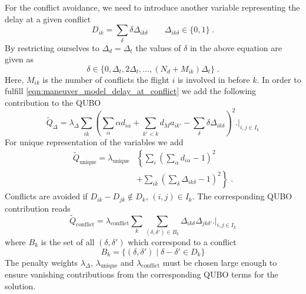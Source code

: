 \documentclass[aps,pra,twocolumn,10pt]{revtex4-1}
\begin{document}
For the conflict avoidance, we need to introduce another variable representing the delay at a given conflict
\begin{equation*}
    D_{ik} = \sum_\delta \delta \Delta_{ik\delta} \qquad \Delta_{ik\delta} \in \{0, 1\} \; .
\end{equation*}
By restricting ourselves to $\Delta_d = \Delta_t$ the values of $\delta$ in the above equation are given as
\begin{equation*}
    \delta \in \{0, \Delta_t, 2\Delta_t, \dots,  (N_d + M_{ik}) \Delta_t\} \; .
\end{equation*}
Here, $M_{ik}$ is the number of conflicts the flight $i$ is involved in before $k$.
In order to fulfill \eqref{eqn:maneuver_model_delay_at_conflict} we add the following contribution to the QUBO
\begin{equation*}
    \tilde Q_\Delta = \lambda_\Delta \sum_{ik}  \left( \sum_{\alpha} \alpha d_{i\alpha}  + \sum_{k'<k} d_M a_{ik'} - \sum_\delta \delta \Delta_{ik\delta}\right)^2 \biggl. \biggr|_{i, j \in I_k}
\end{equation*}
For unique representation of the variables we add 
\begin{align*}
    \tilde Q_\text{unique} = \lambda_\text{unique} & \left\{  \sum_i \left( \sum_\alpha d_{i\alpha} - 1 \right)^2 \right. \\
                      & \left. + \sum_{ik} \left( \sum_\delta \Delta_{ik\delta} - 1 \right)^2 \right\} \; .
\end{align*}
Conflicts are avoided if $D_{ik} - D_{jk} \notin D_k$, $(i, j) \in I_k$. 
The corresponding QUBO contribution reads
\begin{equation*}
    \tilde Q_\text{conflict} = \lambda_\text{conflict} \sum_k \sum_{(\delta, \delta') \in B_k} \Delta_{ik\delta} \Delta_{jk\delta'} \biggl. \biggr|_{i, j \in I_k}
\end{equation*}
where $B_k$ is the set of all $(\delta, \delta')$ which correspond to a conflict
\begin{equation*}
    B_k = \{(\delta, \delta') \; | \; \delta - \delta' \in D_k\}
\end{equation*}
The penalty weights $\lambda_\Delta$, $\lambda_\text{unique}$ and $\lambda_\text{conflict}$ must be chosen large enough to ensure vanishing contributions from the corresponding QUBO terms for the solution.
\end{document}
